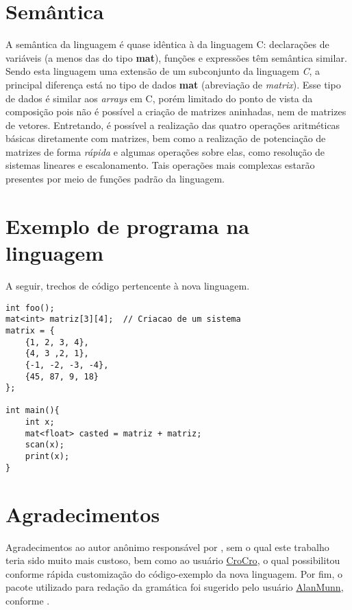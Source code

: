 \documentclass[
	article,			%
	11pt,				%
	oneside,			%
	a4paper,			%
	english,			%
	brazil,				%
	sumario=tradicional
	]{abntex2}
\renewcommand{\it}[1]{\textit{#1}}
\renewcommand{\bf}[1]{\textbf{#1}}
\begin{document}
\section{Semântica}
A semântica da linguagem é quase idêntica à da linguagem C: declarações de variáveis (a menos das do tipo \bf{mat}), funções e expressões têm semântica similar. Sendo esta linguagem uma extensão de um subconjunto da linguagem \it{C}, a principal diferença está no tipo de dados \bf{mat} (abreviação de \it{matrix}). Esse tipo de dados é similar aos \it{arrays} em C, porém limitado do ponto de vista da composição pois não é possível a criação de matrizes aninhadas, nem de matrizes de vetores. Entretando, é possível a realização das quatro operações aritméticas básicas diretamente com matrizes, bem como a realização de potenciação de matrizes de forma \it{rápida} e algumas operações sobre elas, como resolução de sistemas lineares e escalonamento. Tais operações mais complexas estarão presentes por meio de funções padrão da linguagem.

\section{Exemplo de programa na linguagem}
A seguir, trechos de código pertencente à nova linguagem.

\begin{lstlisting}[style=CStyle]
int foo();
mat<int> matriz[3][4];	// Criacao de um sistema 
matrix = {
	{1, 2, 3, 4},
	{4, 3 ,2, 1},
	{-1, -2, -3, -4},
	{45, 87, 9, 18}
};

int main(){
	int x;
	mat<float> casted = matriz + matriz;
	scan(x);
	print(x); 
}
\end{lstlisting}

\section{Agradecimentos}
Agradecimentos ao autor anônimo responsável por \cite{gramatica}, sem o qual este trabalho teria sido muito mais custoso, bem como ao usuário \hyperref{https://tex.stackexchange.com/users/42366/croco}{}{}{CroCro}, o qual possibilitou conforme \cite{custom} rápida customização do código-exemplo da nova linguagem. Por fim, o pacote utilizado para redação da gramática foi sugerido pelo usuário \hyperref{https://tex.stackexchange.com/questions/348651/c-code-to-add-in-the-document}{}{}{AlanMunn}, conforme \cite{bnf}.

% 

\postextual


\end{document}
